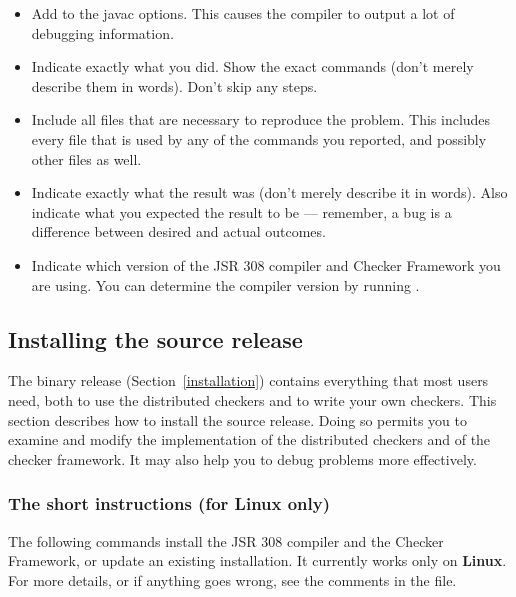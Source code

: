 \begin{itemize}
\item
  Add  to the javac options.  This causes the compiler to output
  a lot of debugging information.
\item
  Indicate exactly what you did.  Show the exact commands (don't merely
  describe them in words).  Don't skip any steps.
\item
  Include all files that are necessary to reproduce the problem.  This
  includes every file that is used by any of the commands you reported, and
  possibly other files as well.
\item
  Indicate exactly what the result was (don't merely describe it in
  words).  Also indicate what you expected the result to be --- remember, a
  bug is a difference between desired and actual outcomes.
\item
  Indicate which version of the JSR 308 compiler and Checker Framework you
  are using.  You can determine the compiler version by running .
\end{itemize}


\subsection{Installing the source release\label{install-source}}

The binary release (Section~\ref{installation}) contains everything that
most users need, both to use the distributed checkers and to write your own
checkers.  This section describes how to install the source release.  Doing
so permits you to examine and modify the implementation of the distributed
checkers and of the checker framework.  It may also help you to debug
problems more effectively.


\subsubsection{The short instructions (for Linux only)}


The following commands install
the JSR 308  compiler and the Checker
Framework, or update an existing installation.
It currently works only on \textbf{Linux}.
For more details, or if anything goes wrong, see the comments in the 
 file.

